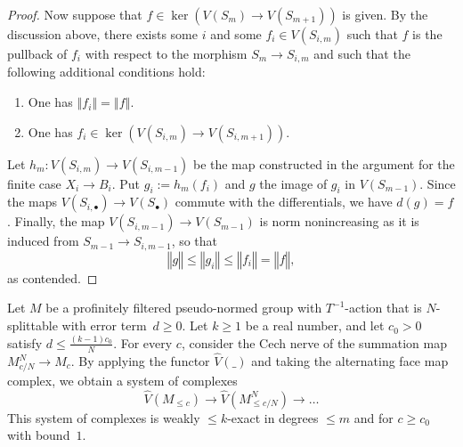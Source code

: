 \begin{proof}
  Now suppose that $f \in \ker(V(S_{m}) \to V(S_{m+1}))$ is given.
  By the discussion above, there exists some $i$ and some $f_{i} \in V(S_{i,m})$ such that $f$ is the pullback of $f_{i}$ with respect to the morphism $S_{m} \to S_{i,m}$ and such that the following additional conditions hold:
  \begin{enumerate}
    \item One has $‖f_{i}‖ = ‖f‖$.
    \item One has $f_{i} \in \ker (V(S_{i,m}) \to V(S_{i,m+1}))$.
  \end{enumerate}
  Let $h_{m} : V(S_{i,m}) \to V(S_{i,m-1})$ be the map constructed in the argument for the finite case $X_{i} \to B_{i}$.
  Put $g_{i} := h_{m} (f_{i})$ and $g$ the image of $g_{i}$ in $V(S_{m-1})$.
  Since the maps $V(S_{i,\bullet}) \to V(S_{\bullet})$ commute with the differentials, we have $d(g) = f$.
  Finally, the map $V(S_{i,m-1}) \to V(S_{m-1})$ is norm nonincreasing as it is induced from $S_{m-1} \to S_{i,m-1}$, so that
  \[ ‖g‖\leq ‖g_{i}‖ \le ‖f_{i}‖ = ‖f‖, \]
  as contended.
\end{proof}

\begin{lemma}
  \label{pre_col_exact}
  \leanok
  Let $M$ be a profinitely filtered pseudo-normed group with $T^{-1}$-action
  that is $N$-splittable with error term~$d \ge 0$.
  Let $k \ge 1$ be a real number,
  and let $c_0 > 0$ satisfy $d \le \frac{(k - 1) c_0}{N}$.
  For every $c$, consider the Cech nerve of the summation map $M^N_{c/N} \to M_c$.
  By applying the functor $\hat V(\_)$ and taking the alternating face map complex,
  we obtain a system of complexes
  \[
    \hat V(M_{\le c}) \to \hat V(M^N_{\le c/N}) \to \dots
  \]
  This system of complexes
  is weakly $\le k$-exact in degrees $\le m$ and for $c \ge c_0$ with bound~$1$.
\end{lemma}

